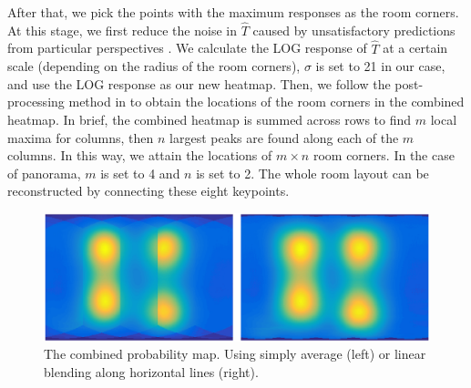 %
After that, we pick the points with the maximum responses as the room corners. 
At this stage, we first reduce the noise in $\hat{T}$ caused by unsatisfactory predictions from particular perspectives .
We calculate the LOG response of $\hat{T}$ at a certain scale (depending on the radius of the room corners), $\sigma$ is set to 21 in our case, and use the LOG response as our new heatmap.
%
Then, we follow the post-processing method in \cite{zou2018layoutnet} to obtain the locations of the room corners in the combined heatmap. In brief, the combined heatmap is summed across rows to find $m$ local maxima for columns, then $n$ largest peaks are found along each of the $m$ columns. In this way, we attain the locations of $m \times n$ room corners. In the case of panorama, $m$ is set to 4 and $n$ is set to 2. The whole room layout can be reconstructed by connecting these eight keypoints. 



\begin{figure}
	\centering
	\includegraphics[width=\linewidth]{figs/blending.png}
	\caption{The combined probability map. Using simply average (left) or linear blending along horizontal lines (right).}
	\label{fig:blending}
\end{figure}


